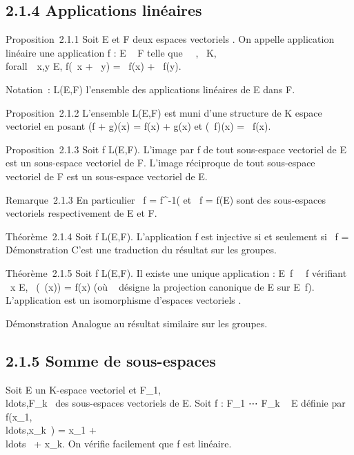 \subsection{2.1.4 Applications linéaires}

Proposition~2.1.1 Soit E et F deux espaces vectoriels . On appelle
application linéaire une application f : E \rightarrow~ F telle que
\forall~\alpha~,\beta~ \in K, \\forall~~x,y \in E,
f(\alpha~x + \beta~y) = \alpha~f(x) + \beta~f(y).

Notation~: L(E,F) l'ensemble des applications linéaires de E dans F.

Proposition~2.1.2 L'ensemble L(E,F) est muni d'une structure de K espace
vectoriel en posant (f + g)(x) = f(x) + g(x) et (\lambda~f)(x) = \lambda~f(x).

Proposition~2.1.3 Soit f \in L(E,F). L'image par f de tout sous-espace
vectoriel de E est un sous-espace vectoriel de F. L'image réciproque de
tout sous-espace vectoriel de F est un sous-espace vectoriel de E.

Remarque~2.1.3 En particulier
\mathrmKer~f =
f^-1(\0\) et
\mathrmIm~f = f(E) sont des
sous-espaces vectoriels respectivement de E et F.

Théorème~2.1.4 Soit f \in L(E,F). L'application f est injective si et
seulement si \mathrmKer~f =
\0\.

Démonstration C'est une traduction du résultat sur les groupes.

Théorème~2.1.5 Soit f \in L(E,F). Il existe une unique application
\overlinef :
E\diagup\mathrmKer~f
\rightarrow~\mathrmIm~f vérifiant
\forall~x \in E, \overlinef~(\pi~(x)) =
f(x) (où \pi~ désigne la projection canonique de E sur
E\diagup\mathrmKer~f).
L'application \overlinef est un isomorphisme
d'espaces vectoriels .

Démonstration Analogue au résultat similaire sur les groupes.

\subsection{2.1.5 Somme de sous-espaces}

Soit E un K-espace vectoriel et
F_1,\\ldots,F_k~
des sous-espaces vectoriels de E. Soit f : F_1
\times⋯ \times F_k \rightarrow~ E définie par
f(x_1,\\ldots,x_k~)
= x_1 +
\\ldots~ +
x_k. On vérifie facilement que f est linéaire.

